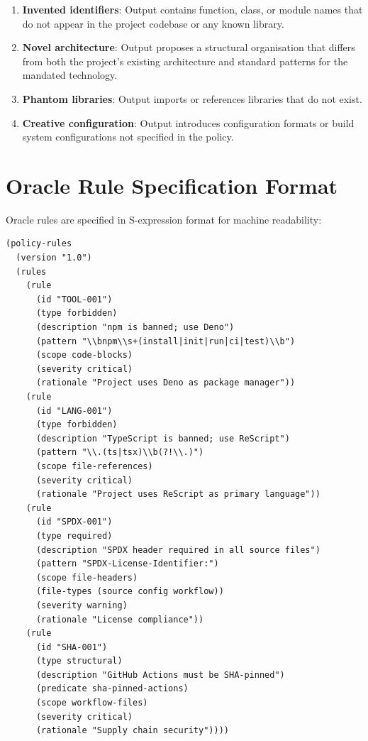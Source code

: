 \documentclass[11pt,a4paper]{article}
\begin{document}
\begin{enumerate}
  \item \textbf{Invented identifiers}: Output contains function,
        class, or module names that do not appear in the project
        codebase or any known library.
  \item \textbf{Novel architecture}: Output proposes a structural
        organisation that differs from both the project's existing
        architecture and standard patterns for the mandated
        technology.
  \item \textbf{Phantom libraries}: Output imports or references
        libraries that do not exist.
  \item \textbf{Creative configuration}: Output introduces
        configuration formats or build system configurations
        not specified in the policy.
\end{enumerate}

\section{Oracle Rule Specification Format}
\label{app:oracle-format}

Oracle rules are specified in S-expression format for machine
readability:

\begin{lstlisting}[caption={Example oracle rule specification.}]
(policy-rules
  (version "1.0")
  (rules
    (rule
      (id "TOOL-001")
      (type forbidden)
      (description "npm is banned; use Deno")
      (pattern "\\bnpm\\s+(install|init|run|ci|test)\\b")
      (scope code-blocks)
      (severity critical)
      (rationale "Project uses Deno as package manager"))
    (rule
      (id "LANG-001")
      (type forbidden)
      (description "TypeScript is banned; use ReScript")
      (pattern "\\.(ts|tsx)\\b(?!\\.)")
      (scope file-references)
      (severity critical)
      (rationale "Project uses ReScript as primary language"))
    (rule
      (id "SPDX-001")
      (type required)
      (description "SPDX header required in all source files")
      (pattern "SPDX-License-Identifier:")
      (scope file-headers)
      (file-types (source config workflow))
      (severity warning)
      (rationale "License compliance"))
    (rule
      (id "SHA-001")
      (type structural)
      (description "GitHub Actions must be SHA-pinned")
      (predicate sha-pinned-actions)
      (scope workflow-files)
      (severity critical)
      (rationale "Supply chain security"))))
\end{lstlisting}
\end{document}
